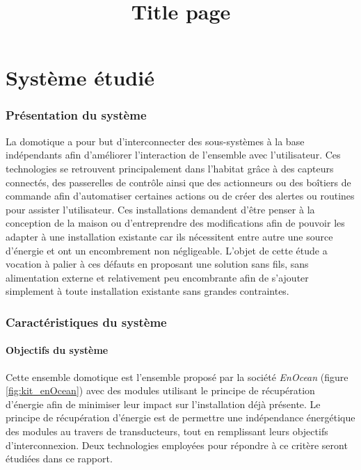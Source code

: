 \documentclass{rapportENS}
\title{Title page}
\begin{document}

\fairepagedegarde %
\tabledematieres %


\part{Système étudié}
 \section{Présentation du système}
 La domotique a pour but d'interconnecter des sous-systèmes à la base indépendants afin d'améliorer l'interaction de l'ensemble avec l'utilisateur. Ces technologies se retrouvent principalement dans l'habitat grâce à des capteurs connectés, des passerelles de contrôle ainsi que des actionneurs ou des boîtiers de commande afin d'automatiser certaines actions ou de créer des alertes ou routines pour assister l'utilisateur. Ces installations demandent d'être penser à la conception de la maison ou d'entreprendre des modifications afin de pouvoir les adapter à une installation existante car ils nécessitent entre autre une source d'énergie et ont un encombrement non négligeable. L'objet de cette étude a vocation à palier à ces défauts en proposant une solution sans fils, sans alimentation externe et relativement peu encombrante afin de s'ajouter simplement à toute installation existante sans grandes contraintes. 
 
 \section{Caractéristiques du système}
 \subsection{Objectifs du système}

 Cette ensemble domotique est l'ensemble proposé par la société \textit{EnOcean} (figure \ref{fig:kit_enOcean}) avec des modules utilisant le principe de récupération d'énergie afin de minimiser leur impact sur l'installation déjà présente. Le principe de récupération d'énergie est de permettre une indépendance énergétique des modules au travers de transducteurs, tout en remplissant leurs objectifs d'interconnexion. Deux technologies employées pour répondre à ce critère seront étudiées dans ce rapport. 
 
\end{document}
